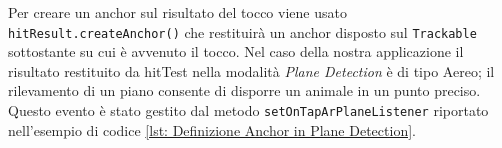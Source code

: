 \documentclass[crop=false, class=book]{standalone}
\begin{document}
	\noindent
	Per creare un anchor sul risultato del tocco viene usato \verb|hitResult.createAnchor()| che restituirà un anchor disposto sul \verb|Trackable| sottostante su cui è avvenuto il tocco.
	Nel caso della nostra applicazione il risultato restituito da hitTest nella modalità \emph{Plane Detection} è di tipo Aereo; il rilevamento di un piano consente di disporre un animale in un punto preciso. Questo evento è stato gestito dal metodo \verb|setOnTapArPlaneListener| riportato nell'esempio di codice \vref{lst: Definizione Anchor in Plane Detection}.
			
	
\end{document}
